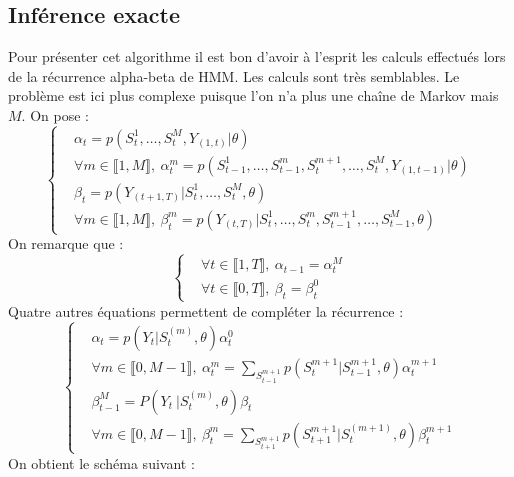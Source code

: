 \documentclass[10pt,a4paper]{article}
\newcommand{\hmm}{\textsc{HMM}}
\begin{document}
\subsection{Inférence exacte}
Pour présenter cet algorithme il est bon d'avoir à l'esprit les calculs 
effectués lors de la récurrence alpha-beta de \hmm. Les calculs sont très 
semblables.
Le problème est ici plus complexe puisque l'on n'a plus une chaîne de Markov 
mais $M$. On pose :
\begin{equation}
\left\lbrace
\begin{aligned}
&\alpha_t=p(S_t^{1},\dots,S_t^{M},Y_{(1,t)}\vert \theta) \\
&\forall m \in \llbracket 1,M \rrbracket, \ \alpha_t^m=p(S_{t-1}^1, \dots, 
S_{t-1}^m,S_{t}^{m+1}, \dots, S_{t}^M, Y_{(1,t-1)} \vert \theta) \\
&\beta_t=p(Y_{(t+1,T)} \vert S_t^1, \dots,S_t^M, \theta) \\
&\forall m \in \llbracket 1,M \rrbracket, \ \beta_t^m=p(Y_{(t,T)} \vert S_t^1, 
\dots, S_t^m,S_{t-1}^{m+1}, \dots, S_{t-1}^M, \theta)
\end{aligned}
\right.
\end{equation}
On remarque que :
\begin{equation}
\left\lbrace 
\begin{aligned}
&\forall t \in \llbracket 1,T \rrbracket, \ \alpha_{t-1}=\alpha_{t}^M  \\
&\forall t \in \llbracket 0,T \rrbracket, \ \beta_{t}=\beta_{t}^0
\end{aligned}
\right.
\end{equation}
Quatre autres équations permettent de compléter la récurrence :
\begin{equation}
\left\lbrace
\begin{aligned}
&\alpha_t=p(Y_t \vert S_t^{(m)}, \theta)\alpha_t^0 \\
&\forall m \in \llbracket 0,M-1 \rrbracket, \ 
\alpha_t^m=\underset{S_{t-1}^{m+1}}{\sum}p(S_t^{m+1} \vert S_{t-1}^{m+1}, 
\theta) \alpha_t^{m+1} \\
&\beta_{t-1}^M=P( Y_t \ \vert S_t^{(m)},\theta) \beta_t \\
&\forall m \in \llbracket 0, M-1 \rrbracket, \ 
\beta_t^{m}=\underset{S_{t+1}^{m+1}}{\sum}p(S_{t+1}^{m+1} \vert S_{t}^{(m+1)}, 
\theta) \beta_{t}^{m+1}
\end{aligned}
\right.
\end{equation}
On obtient le schéma suivant :
\end{document}
